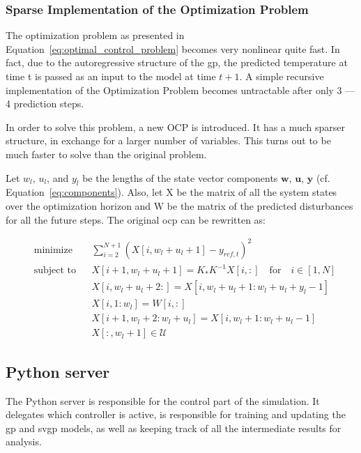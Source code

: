 \subsubsection{Sparse Implementation of the Optimization Problem}

The optimization problem as presented in
Equation~\ref{eq:optimal_control_problem} becomes very nonlinear quite fast. In
fact, due to the autoregressive structure of the \acrshort{gp}, the predicted
temperature at time t is passed as an input to the model at time $t+1$. A simple
recursive implementation of the Optimization Problem becomes untractable after
only 3 --- 4 prediction steps. 

In order to solve this problem, a new OCP is introduced. It has a much sparser
structure, in exchange for a larger number of variables. This turns out to be
much faster to solve than the original problem.

Let $w_l$, $u_l$, and $y_l$ be the lengths of the state vector components
$\mathbf{w}$, $\mathbf{u}$, $\mathbf{y}$ (cf. Equation~\ref{eq:components}).
Also, let X be the matrix of all the system states over the optimization horizon
and W be the matrix of the predicted disturbances for all the future steps. The
original \acrlong{ocp} can be rewritten as:

\begin{subequations}\label{eq:sparse_optimal_control_problem}
    \begin{align}
        & \text{minimize}
        & & \sum_{i=2}^{N + 1} \left(X[i, w_l + u_l + 1] - y_{ref, t}\right)^2 \\
        & \text{subject to}
        & & X[i+1, w_l + u_l + 1] = K_*K^{-1}X[i, :] \quad \text{for} \quad
        i\in[1, N]\\
        &&& X[i, w_l + u_l + 2: ] = X[i, w_l+ u_l + 1: w_l + u_l + y_l - 1]\\
        &&& X[i, 1:w_l] = W[i, :] \\
        &&& X[i+1, w_l + 2: w_l + u_l] = X[i, w_l + 1: w_l + u_l - 1] \\
        &&& X[:, w_l + 1] \in \mathcal{U}
    \end{align}
\end{subequations}

\subsection{Python server}

The Python server is responsible for the control part of the simulation. It
delegates which controller is active, is responsible for training and updating
the \acrshort{gp} and \acrshort{svgp} models, as well as keeping track of all
the intermediate results for analysis.

